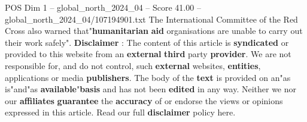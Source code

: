 \begin{textsample}{POS Dim 1 – global\_north\_2024\_04 – Score 41.00 – global\_north\_2024\_04/107194901.txt}
The International Committee of the Red Cross also warned that"\textbf{humanitarian} \textbf{aid} organisations are unable to carry out their work safely". \textbf{Disclaimer} : The content of this article is \textbf{syndicated} or provided to this website from an \textbf{external} \textbf{third} party \textbf{provider}.
We are not responsible for, and do not control, such \textbf{external} websites, \textbf{entities}, applications or media \textbf{publishers}.
The body of the \textbf{text} is provided on an"as is"and"as \textbf{available}"\textbf{basis} and has not been \textbf{edited} in any way.
Neither we nor our \textbf{affiliates} \textbf{guarantee} the \textbf{accuracy} of or endorse the views or opinions expressed in this article.
Read our full \textbf{disclaimer} policy here.

\end{textsample}
